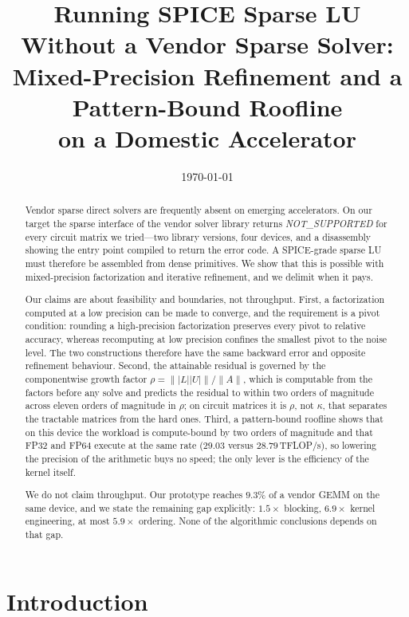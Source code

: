\documentclass[11pt]{article}
\title{Running SPICE Sparse LU Without a Vendor Sparse Solver:\\
Mixed-Precision Refinement and a Pattern-Bound Roofline\\[2pt]
\large on a Domestic Accelerator}
\author{\todo{authors}}
\date{\today}
\theoremstyle{remark}
\newcommand{\norm}[1]{\lVert #1 \rVert}
\newcommand{\abs}[1]{\lvert #1 \rvert}
\begin{document}
\maketitle

\begin{abstract}
Vendor sparse direct solvers are frequently absent on emerging accelerators. On
our target the sparse interface of the vendor solver library returns
\emph{NOT\_SUPPORTED} for every circuit matrix we tried---two library versions,
four devices, and a disassembly showing the entry point compiled to return the
error code. A SPICE-grade sparse LU must therefore be assembled from dense
primitives. We show that this is possible with mixed-precision factorization and
iterative refinement, and we delimit when it pays.

Our claims are about feasibility and boundaries, not throughput. First, a
factorization computed at a low precision can be made to converge, and the
requirement is a pivot condition: rounding a high-precision factorization
preserves every pivot to relative accuracy, whereas recomputing at low precision
confines the smallest pivot to the noise level. The two constructions therefore
have the same backward error and opposite refinement behaviour. Second, the
attainable residual is governed by the componentwise growth factor
$\rho=\norm{\abs{L}\abs{U}}/\norm{A}$, which is computable from the factors
before any solve and predicts the residual to within two orders of magnitude
across eleven orders of magnitude in $\rho$; on circuit matrices it is $\rho$,
not $\kappa$, that separates the tractable matrices from the hard ones. Third, a
pattern-bound roofline shows that on this device the workload is compute-bound by
two orders of magnitude and that FP32 and FP64 execute at the same rate
($29.03$ versus $28.79$\,TFLOP/s), so lowering the precision of the arithmetic
buys no speed; the only lever is the efficiency of the kernel itself.

We do not claim throughput. Our prototype reaches $9.3\%$ of a vendor GEMM on the
same device, and we state the remaining gap explicitly: $1.5\times$ blocking,
$6.9\times$ kernel engineering, at most $5.9\times$ ordering. None of the
algorithmic conclusions depends on that gap.
\end{abstract}

\section{Introduction}
\end{document}
